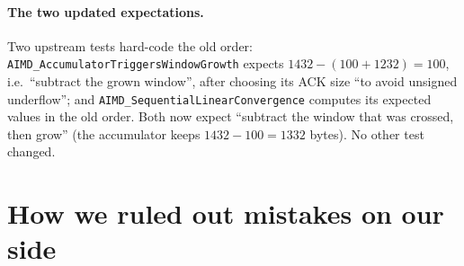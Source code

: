 \documentclass[11pt,a4paper]{article}
\begin{document}
\paragraph{The two updated expectations.} Two upstream tests hard-code the old
order: \texttt{AIMD\_\allowbreak{}Accumulator\allowbreak{}Triggers\allowbreak{}Window\allowbreak{}Growth} expects
$1432 - (100 + 1232) = 100$, i.e.\ ``subtract the grown window'', after
choosing its ACK size ``to avoid unsigned underflow''; and
\texttt{AIMD\_\allowbreak{}Sequential\allowbreak{}Linear\allowbreak{}Convergence} computes its expected values in the
old order. Both now expect ``subtract the window that was crossed, then grow''
(the accumulator keeps $1432 - 100 = 1332$ bytes). No other test changed.

\section{How we ruled out mistakes on our side}
\end{document}
